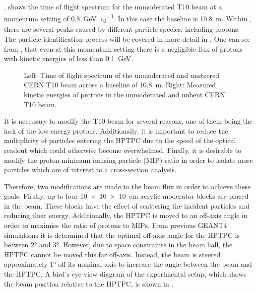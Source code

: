 , shows the time of flight spectrum for the unmoderated T10 beam at a momentum setting of \SI{0.8}{\giga\electronvolt\per\clight}.
In this case the baseline is \SI{10.8}{\metre}.
Within , there are several peaks caused by different particle species, including protons.
The particle identification process will be covered in more detail in .
One can see from , that even at this momentum setting there is a negligible flux of protons with kinetic energies of less than \SI{0.1}{\giga\electronvolt}.

\begin{figure}[h]
  \begin{minipage}[t]{.5\textwidth}
    \begin{adjustbox}{max totalsize=\textwidth, center}
      
    \end{adjustbox}
  \end{minipage}
  \begin{minipage}[t]{.5\textwidth}
    \begin{adjustbox}{max totalsize=\textwidth, center}
      
    \end{adjustbox}
  \end{minipage}
  \caption[Time of flight spectrum and proton kinetic energy for the unmoderated and unsteered T10 beam]{Left: Time of flight spectrum of the unmoderated and unsteered CERN T10 beam across a baseline of \SI{10.8}{\metre}. Right: Measured kinetic energies of protons in the unmoderated and unbent CERN T10 beam.}
  \label{fig:unmoderatedBeam}
\end{figure}

It is necessary to modify the T10 beam for several reasons, one of them being the lack of the low energy protons.
Additionally, it is important to reduce the multiplicity of particles entering the HPTPC due to the speed of the optical readout which could otherwise become overwhelmed.
Finally, it is desirable to modify the proton-minimum ionising particle (MIP) ratio in order to isolate more particles which are of interest to a cross-section analysis.

Therefore, two modifications are made to the beam flux in order to achieve these goals.
Firstly, up to four \SI{10 x 10 x 10}{\cm} acrylic moderator blocks are placed in the beam.
These blocks have the effect of scattering the incident particles and reducing their energy.
Additionally, the HPTPC is moved to an off-axis angle in order to maximise the ratio of protons to MIPs.
From previous GEANT4~\cite{geant} simulations it is determined that the optimal off-axis angle for the HPTPC is between \ang{2} and \ang{3}.
However, due to space constraints in the beam hall, the HPTPC cannot be moved this far off-axis.
Instead, the beam is steered approximately \ang{1} off its nominal axis to increase the angle between the beam and the HPTPC.
A bird's-eye view diagram of the experimental setup, which shows the beam position relative to the HPTPC, is shown in .


